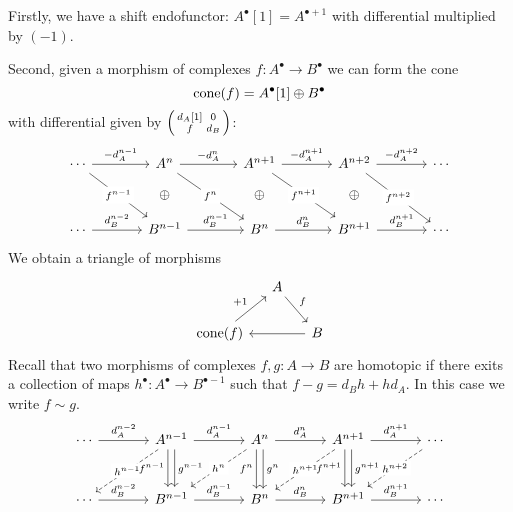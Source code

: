 \documentclass[number-in-sections,a4paper]{notes}
\begin{document}
Firstly, we have a shift endofunctor: $A^\bullet[1] = A^{\bullet + 1}$ with differential multiplied by $(-1)$.

Second, given a morphism of complexes $f\colon A^\bullet \to B^\bullet$ we can form the cone \[
    \operatorname{cone}(f) = A^\bullet[1] \oplus B^\bullet
\]
with differential given by $\begin{psmallmatrix}d_A[1] & 0 \\ f & d_B\end{psmallmatrix}$:
\[
    \begin{tikzcd}[column sep=large, row sep=small]
        \cdots \arrow[r, "-d_A^{n-1}"] \arrow[ddr, "f^{n-1}" description]
        &
        A^{n} \arrow[r, "-d_A^{n}"] \arrow[ddr, "f^n" description] 
        &
        A^{n+1} \arrow[r, "-d_A^{n+1}"] \arrow[ddr, "f^{n+1}" description]
        &
        A^{n+2} \arrow[r, "-d_A^{n+2}"] \arrow[ddr, "f^{n+2}" description]
        &
        \cdots
        \\
        & \oplus & \oplus & \oplus & \\
        \cdots \arrow[r, "d_B^{n-2}"]
        &
        B^{n-1} \arrow[r, "d_B^{n-1}"]
        &
        B^{n} \arrow[r, "d_B^{n}"]
        &
        B^{n+1} \arrow[r, "d_B^{n+1}"]
        &
        \cdots
    \end{tikzcd}
\]
We obtain a triangle of morphisms
\[
    \begin{tikzcd}[column sep=small]
        & A \arrow[dr, "f"] & \\
        \cone(f) \arrow[ur, "+1"] & & B \arrow[ll]
    \end{tikzcd}
\]
Recall that two morphisms of complexes $f,g\colon A \to B$ are homotopic if there exits a collection of maps $h^\bullet\colon A^\bullet \to B^{\bullet-1}$ such that $f-g = d_Bh + hd_A$.
In this case we write $f \sim g$.
\[
    \begin{tikzcd}[column sep=large, row sep=large]
        \cdots \arrow[r, "d_A^{n-2}"]
        &
        A^{n-1} \arrow[r, "d_A^{n-1}"] \arrow[dl, dashed, "h^{n-1}" description] \arrow[d, shift right, "f^{n-1}"'] \arrow[d, shift left, "g^{n-1}"]
        &
        A^{n} \arrow[r, "d_A^{n}"] \arrow[dl, dashed, "h^{n}" description] \arrow[d, shift right, "f^{n}"'] \arrow[d, shift left, "g^{n}"]
        &
        A^{n+1} \arrow[r, "d_A^{n+1}"] \arrow[dl, dashed, "h^{n+1}" description] \arrow[d, shift right, "f^{n+1}"'] \arrow[d, shift left, "g^{n+1}"]
        &
        \cdots \arrow[dl, dashed, "h^{n+2}" description]
        \\
        \cdots \arrow[r, "d_B^{n-2}"]
        &
        B^{n-1} \arrow[r, "d_B^{n-1}"]
        &
        B^{n} \arrow[r, "d_B^{n}"]
        &
        B^{n+1} \arrow[r, "d_B^{n+1}"]
        &
        \cdots
    \end{tikzcd}
\]
\end{document}
